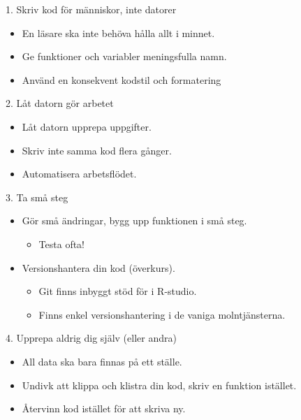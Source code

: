 \documentclass[
  11pt,
  ignorenonframetext,
]{beamer}
\providecommand{\tightlist}{%
  \setlength{\itemsep}{0pt}\setlength{\parskip}{0pt}}
\begin{document}
\begin{frame}{1. Skriv kod för människor, inte datorer}
\label{skriv-kod-fuxf6r-muxe4nniskor-inte-datorer}
\begin{itemize}
\tightlist
\item
  En läsare ska inte behöva hålla allt i minnet.
\item
  Ge funktioner och variabler meningsfulla namn.
\item
  Använd en konsekvent kodstil och formatering
\end{itemize}
\end{frame}

\begin{frame}{2. Låt datorn gör arbetet}
\label{luxe5t-datorn-guxf6r-arbetet}
\begin{itemize}
\tightlist
\item
  Låt datorn upprepa uppgifter.
\item
  Skriv inte samma kod flera gånger.
\item
  Automatisera arbetsflödet.
\end{itemize}
\end{frame}

\begin{frame}{3. Ta små steg}
\label{ta-smuxe5-steg}
\begin{itemize}
\tightlist
\item
  Gör små ändringar, bygg upp funktionen i små steg.

  \begin{itemize}
  \tightlist
  \item
    Testa ofta!
  \end{itemize}
\item
  Versionshantera din kod (överkurs).

  \begin{itemize}
  \tightlist
  \item
    Git finns inbyggt stöd för i R-studio.
  \item
    Finns enkel versionshantering i de vaniga molntjänsterna.
  \end{itemize}
\end{itemize}
\end{frame}

\begin{frame}{4. Upprepa aldrig dig själv (eller andra)}
\label{upprepa-aldrig-dig-sjuxe4lv-eller-andra}
\begin{itemize}
\tightlist
\item
  All data ska bara finnas på ett ställe.
\item
  Undivk att klippa och klistra din kod, skriv en funktion istället.
\item
  Återvinn kod istället för att skriva ny.
\end{itemize}
\end{frame}
\end{document}
